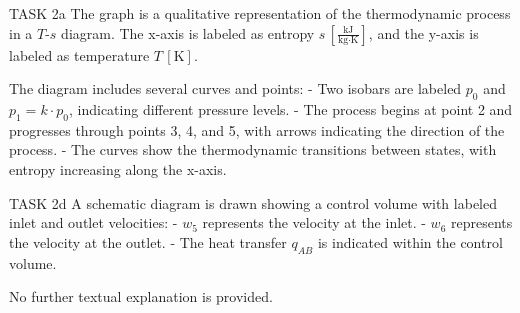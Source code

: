 TASK 2a  
The graph is a qualitative representation of the thermodynamic process in a \( T \)-\( s \) diagram. The x-axis is labeled as entropy \( s \, [\frac{\text{kJ}}{\text{kg·K}}] \), and the y-axis is labeled as temperature \( T \, [\text{K}] \).  

The diagram includes several curves and points:  
- Two isobars are labeled \( p_0 \) and \( p_1 = k \cdot p_0 \), indicating different pressure levels.  
- The process begins at point 2 and progresses through points 3, 4, and 5, with arrows indicating the direction of the process.  
- The curves show the thermodynamic transitions between states, with entropy increasing along the x-axis.  

TASK 2d  
A schematic diagram is drawn showing a control volume with labeled inlet and outlet velocities:  
- \( w_5 \) represents the velocity at the inlet.  
- \( w_6 \) represents the velocity at the outlet.  
- The heat transfer \( q_{AB} \) is indicated within the control volume.  

No further textual explanation is provided.